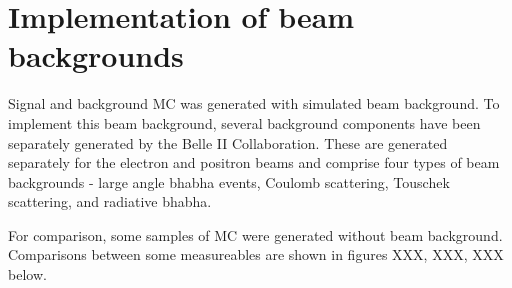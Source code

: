 \documentclass[12pt]{thesis}  %
\begin{document}
\section{Implementation of beam backgrounds}

Signal and background MC was generated with simulated beam background. To implement this beam background, several background components have been separately generated by the Belle II Collaboration. These are generated separately for the electron and positron beams and comprise four  types of beam backgrounds - large angle bhabha events, Coulomb scattering, Touschek scattering, and radiative bhabha.

For comparison, some samples of MC were generated without beam background. Comparisons between some measureables are shown in figures XXX, XXX, XXX below.
\end{document}
